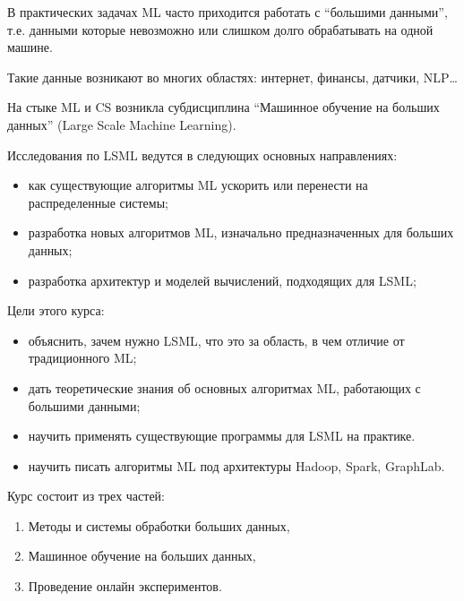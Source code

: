 В практических задачах ML часто приходится работать с “большими данными”, т.е. данными которые невозможно или слишком долго обрабатывать на одной машине. \newline

Такие данные возникают во многих областях: интернет, финансы, датчики, NLP… \newline

На стыке ML и CS возникла субдисциплина “Машинное обучение на больших данных” (Large Scale Machine Learning). \newline

Исследования по LSML ведутся в следующих основных направлениях:
\begin{itemize}
    \item как существующие алгоритмы ML ускорить или перенести на распределенные системы;
    \item разработка новых алгоритмов ML, изначально предназначенных для больших данных;
    \item разработка архитектур и моделей вычислений, подходящих для LSML;
\end{itemize}
$ $\\ 
Цели этого курса:
\begin{itemize}
    \item объяснить, зачем нужно LSML, что это за область, в чем отличие от традиционного ML;
    \item дать теоретические знания об основных алгоритмах ML, работающих с большими данными;
    \item научить применять существующие программы для LSML на практике.
    \item научить писать алгоритмы ML под архитектуры Hadoop, Spark, GraphLab.
\end{itemize}
$ $\\ 
Курс состоит из трех частей:
\begin{enumerate}
    \item Методы и системы обработки больших данных,
    \item Машинное обучение на больших данных,
    \item Проведение онлайн экспериментов.
\end{enumerate}